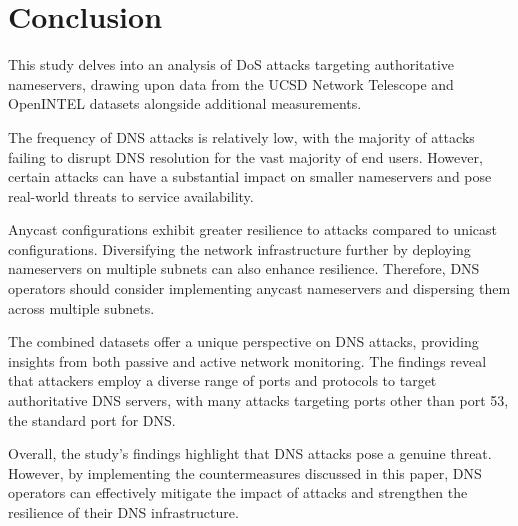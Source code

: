 \section{Conclusion}
This study delves into an analysis of \ac{DoS} attacks targeting authoritative nameservers, drawing upon data from the UCSD Network Telescope and OpenINTEL datasets alongside additional measurements.

The frequency of DNS attacks is relatively low, with the majority of attacks failing to disrupt DNS resolution for the vast majority of end users.
However, certain attacks can have a substantial impact on smaller nameservers and pose real-world threats to service availability.

Anycast configurations exhibit greater resilience to attacks compared to unicast configurations.
Diversifying the network infrastructure further by deploying nameservers on multiple subnets can also enhance resilience.
Therefore, DNS operators should consider implementing anycast nameservers and dispersing them across multiple subnets.

The combined datasets offer a unique perspective on DNS attacks, providing insights from both passive and active network monitoring.
The findings reveal that attackers employ a diverse range of ports and protocols to target authoritative DNS servers, with many attacks targeting ports other than port 53, the standard port for DNS.

Overall, the study's findings highlight that DNS attacks pose a genuine threat.
However, by implementing the countermeasures discussed in this paper, DNS operators can effectively mitigate the impact of attacks and strengthen the resilience of their DNS infrastructure.